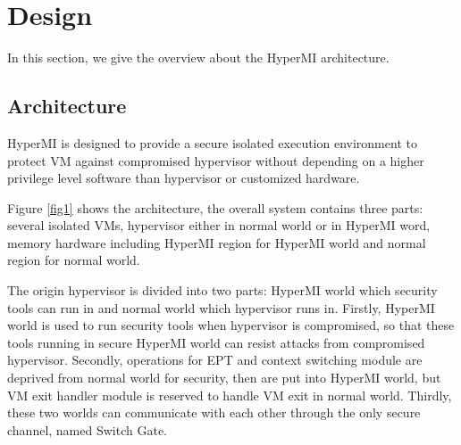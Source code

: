 \documentclass[conference]{IEEEtran}
\begin{document}

\section{Design}
In this section, we give the overview about the HyperMI architecture.%


\subsection{Architecture} 

HyperMI is designed to provide a secure isolated execution environment to protect VM against compromised hypervisor without depending on a higher privilege level software than hypervisor or customized hardware.

Figure \ref{fig1} shows the architecture, the overall system contains three parts: several isolated VMs, hypervisor either in normal world or in HyperMI word, memory hardware including HyperMI region for HyperMI world and normal region for normal world.

The origin hypervisor is divided into two parts: HyperMI world which security tools can run in and normal world which hypervisor runs in. Firstly, HyperMI world is used to run security tools when hypervisor is compromised, so that these tools running in secure HyperMI world can resist attacks from compromised hypervisor. Secondly, operations for EPT and context switching module are deprived from normal world for security, then are put into HyperMI world, but VM exit handler module is reserved to handle VM exit in normal world. Thirdly, these two worlds can communicate with each other through the only secure channel, named Switch Gate. 
\end{document}
